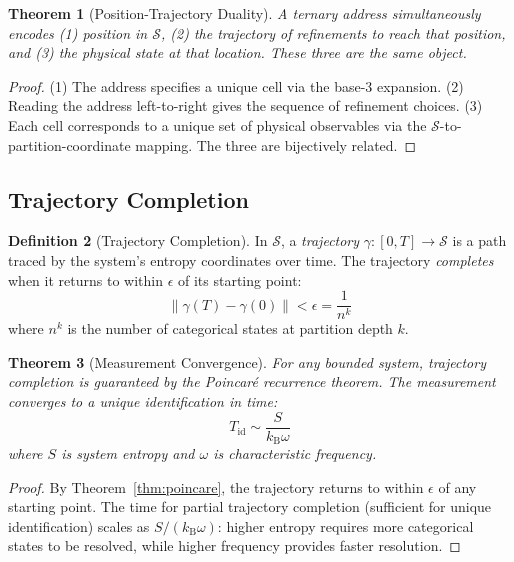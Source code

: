 \documentclass[11pt,a4paper]{article}
\newtheorem{theorem}{Theorem}[section]
\theoremstyle{definition}
\newtheorem{definition}[theorem]{Definition}
\theoremstyle{remark}
\newcommand{\kB}{k_{\mathrm{B}}}
\newcommand{\Sspace}{\mathcal{S}}
\begin{document}
\begin{theorem}[Position-Trajectory Duality]
\label{thm:position_trajectory}
A ternary address simultaneously encodes (1) position in $\Sspace$, (2) the trajectory of refinements to reach that position, and (3) the physical state at that location. These three are the same object.
\end{theorem}

\begin{proof}
(1) The address specifies a unique cell via the base-3 expansion. (2) Reading the address left-to-right gives the sequence of refinement choices. (3) Each cell corresponds to a unique set of physical observables via the $\Sspace$-to-partition-coordinate mapping. The three are bijectively related.
\end{proof}

\subsection{Trajectory Completion}

\begin{definition}[Trajectory Completion]
\label{def:trajectory}
In $\Sspace$, a \emph{trajectory} $\gamma: [0,T] \to \Sspace$ is a path traced by the system's entropy coordinates over time. The trajectory \emph{completes} when it returns to within $\epsilon$ of its starting point:
\begin{equation}
\|\gamma(T) - \gamma(0)\| < \epsilon = \frac{1}{n^k}
\end{equation}
where $n^k$ is the number of categorical states at partition depth $k$.
\end{definition}

\begin{theorem}[Measurement Convergence]
\label{thm:convergence}
For any bounded system, trajectory completion is guaranteed by the Poincar\'e recurrence theorem. The measurement converges to a unique identification in time:
\begin{equation}
T_{\mathrm{id}} \sim \frac{S}{\kB \omega}
\end{equation}
where $S$ is system entropy and $\omega$ is characteristic frequency.
\end{theorem}

\begin{proof}
By Theorem~\ref{thm:poincare}, the trajectory returns to within $\epsilon$ of any starting point. The time for partial trajectory completion (sufficient for unique identification) scales as $S/(\kB \omega)$: higher entropy requires more categorical states to be resolved, while higher frequency provides faster resolution.
\end{proof}
\end{document}
